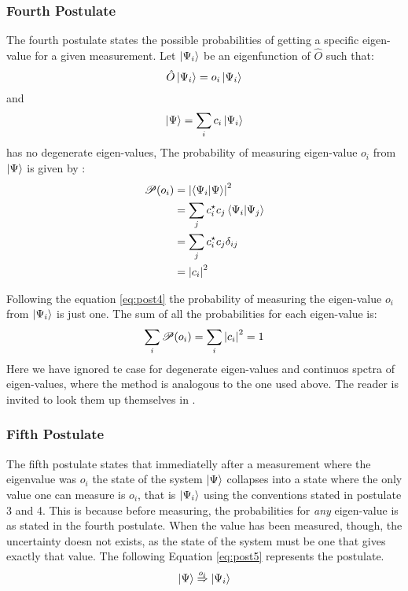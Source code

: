 \documentclass[../master_thesis.tex]{subfiles}
\begin{document}
\subsubsection{Fourth Postulate}
The fourth postulate states the possible probabilities of getting a specific
eigen-value for a given measurement.
Let $\ket{\Psi_i}$ be an eigenfunction of $\hat{O}$ such that:
\begin{equation}
  \hat{O}\ket{\Psi_i} = o_i\ket{\Psi_i}
\end{equation}
and
\begin{equation}
  \ket{\Psi} = \sum_i c_i \ket{\Psi_i} \label{eq:lincomb}
\end{equation}
has no degenerate eigen-values,
The probability of measuring eigen-value $o_i$ from $\ket{\Psi}$ is given by
\cite{Cohen:1973}:
\begin{align} \label{eq:post4}
  \begin{split}
    \mathscr{P}(o_i) &= \abs{\braket{\Psi_i|\Psi}}^2\\
                     &= \sum_{j}c_i^\star c_j\braket{\Psi_i|\Psi_j}\\
                     &= \sum_{j}c_i^\star c_j\delta_{ij}\\
                     &= \abs{c_i}^2
  \end{split}
\end{align}

Following the equation \ref{eq:post4} the probability of measuring the
eigen-value $o_i$ from $\ket{\Psi_i}$ is just one. The sum of all the probabilities
for each eigen-value is:
\begin{equation}
  \sum_i\mathscr{P}(o_i) = \sum_i \abs{c_i}^2 = 1
\end{equation}
Here we have ignored te case for degenerate eigen-values and continuos spctra of
eigen-values, where the method is analogous to the one used above. The reader is
invited to look them up themselves in \cite{Cohen:1973, Atkins:2011}.

\subsubsection{Fifth Postulate}
The fifth postulate states that immediatelly after a measurement where the eigenvalue was $o_i$
the state of the system $\ket{\Psi}$ collapses into a state where the only value one
can measure is $o_i$, that is $ \ket{\Psi_i} $ using the conventions stated in postulate 3 and 4.
This is because before measuring, the probabilities for \textit{any} eigen-value
is as stated in the fourth postulate. When the value has been measured, though,
the uncertainty doesn not exists, as the state of the system must be one that gives
exactly that value. The following Equation \ref{eq:post5} represents the postulate.
\begin{equation}\label{eq:post5}
  \ket{\Psi} \stackrel{o_i}{\Rightarrow} \ket{\Psi_i}
\end{equation}
\end{document}
